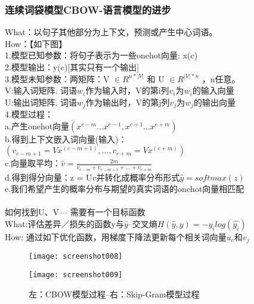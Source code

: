 \documentclass[
10pt, %
a4paper, %
oneside, %
headinclude,footinclude, %
BCOR5mm, %
]{scrartcl}
\begin{document}
\subsubsection{\color{blue}连续词袋模型CBOW-语言模型的进步}
What：以句子其他部分为上下文，预测或产生中心词语。
\\How：【如下图】
\\\indent 1.模型已知参数：将句子表示为一些onehot向量: x(c)
\\\indent 2.模型输出：y(c)[其实只有一个输出]
\\\indent 3.模型未知参数：两矩阵：V $\in R^{n*|V|}$ 和 U $\in R^{|V|*n}$ ，n任意。
\\\indent \indent V:输入词矩阵. 词语$w_i$作为输入时，V的第i列$v_i$为$w_i$的输入向量
\\\indent \indent U:输出词矩阵. 词语$w_j$作为输出时，V的第j列$v_j$为$w_j$的输出向量
\\\indent 4.模型过程：
\\\indent \indent a.产生onehot向量$(x^{c-m}...x^{c-1},x^{c+1}...x^{c+m})$
\\\indent \indent b.得到上下文嵌入词向量(输入)：
\\\indent \indent $(v_{c-m+1} = Vx^{(c-m+1)},...,v_{c+m} = Vx^{(c+m)})$
\\\indent \indent c.向量取平均：$\hat{v}=\frac{2m}{v_{c-m}+v_{c-m+1}+...+v_{c+m}}$
\\\indent \indent d.得到得分向量：z = U$\hat{v}$并转化成概率分布形式$\hat{y}=softmax(z)$
\\\indent \indent e.我们希望产生的概率分布与期望的真实词语的onehot向量相匹配
\\\\如何找到U、V--- 需要有一个目标函数
\\What:评估差异／损失的函数y与$\hat{y}$--交叉熵$H(\hat{y}, y)= -y_i log(\hat{y_i})$
\\How: 通过如下优化函数，用梯度下降法更新每个相关词向量$u_c$和$v_j$
\begin{figure}[!htb]
	\centering
	\texttt{[image: screenshot008]}
	\caption*{}
	\label{fig:screenshot008}
\end{figure}
\begin{figure}[!htb]
	\centering
	\texttt{[image: screenshot009]}
	\caption{左：CBOW模型过程--右：Skip-Gram模型过程}
	\label{fig:screenshot009}
\end{figure}
\end{document}
